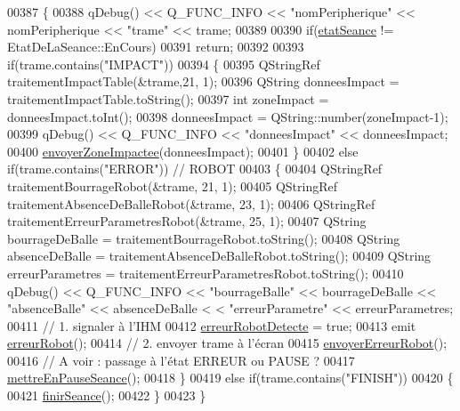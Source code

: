\begin{DoxyCode}
00387 \{
00388     qDebug() << Q\_FUNC\_INFO << \textcolor{stringliteral}{"nomPeripherique"} << nomPeripherique << \textcolor{stringliteral}{"trame"} << trame;
00389 
00390     \textcolor{keywordflow}{if}(\hyperlink{class_communication_bluetooth_adc66f3034d46f3964a26b62ad98e784f}{etatSeance} != EtatDeLaSeance::EnCours)
00391         \textcolor{keywordflow}{return};
00392 
00393     \textcolor{keywordflow}{if}(trame.contains(\textcolor{stringliteral}{"IMPACT"}))
00394     \{
00395         QStringRef traitementImpactTable(&trame,21, 1);
00396         QString donneesImpact = traitementImpactTable.toString();
00397         \textcolor{keywordtype}{int} zoneImpact = donneesImpact.toInt();
00398         donneesImpact = QString::number(zoneImpact-1);
00399         qDebug() << Q\_FUNC\_INFO << \textcolor{stringliteral}{"donneesImpact"} << donneesImpact;
00400         \hyperlink{class_communication_bluetooth_a5906cd18db7ce9467452acf0ed845f23}{envoyerZoneImpactee}(donneesImpact);
00401     \}
00402     \textcolor{keywordflow}{else} \textcolor{keywordflow}{if}(trame.contains(\textcolor{stringliteral}{"ERROR"})) \textcolor{comment}{// ROBOT}
00403     \{
00404         QStringRef traitementBourrageRobot(&trame, 21, 1);
00405         QStringRef traitementAbsenceDeBalleRobot(&trame, 23, 1);
00406         QStringRef traitementErreurParametresRobot(&trame, 25, 1);
00407         QString bourrageDeBalle = traitementBourrageRobot.toString();
00408         QString absenceDeBalle = traitementAbsenceDeBalleRobot.toString();
00409         QString erreurParametres = traitementErreurParametresRobot.toString();
00410         qDebug() << Q\_FUNC\_INFO << \textcolor{stringliteral}{"bourrageBalle"} << bourrageDeBalle << \textcolor{stringliteral}{"absenceBalle"} << absenceDeBalle <
      < \textcolor{stringliteral}{"erreurParametre"} << erreurParametres;
00411         \textcolor{comment}{// 1. signaler à l'IHM}
00412         \hyperlink{class_communication_bluetooth_a0ceb51c44da6c7479b46ae8e737e1541}{erreurRobotDetecte} = \textcolor{keyword}{true};
00413         emit \hyperlink{class_communication_bluetooth_a74bc2dc753fa3490a2847f3c9497e147}{erreurRobot}();
00414         \textcolor{comment}{// 2. envoyer trame à l'écran}
00415         \hyperlink{class_communication_bluetooth_a891295407273a810ef9300e743bc34f9}{envoyerErreurRobot}();
00416         \textcolor{comment}{// A voir : passage à l'état ERREUR ou PAUSE ?}
00417         \hyperlink{class_communication_bluetooth_a8572b6316814e3d226ce7acc754f0c4d}{mettreEnPauseSeance}();
00418     \}
00419     \textcolor{keywordflow}{else} \textcolor{keywordflow}{if}(trame.contains(\textcolor{stringliteral}{"FINISH"}))
00420     \{
00421         \hyperlink{class_communication_bluetooth_ab2170ef9c868ac2a26b76675c71f770e}{finirSeance}();
00422     \}
00423 \}
\end{DoxyCode}
\mbox{\label{class_communication_bluetooth_a51ea5f21cc952cabc02c0a0f364b69d9}} 
